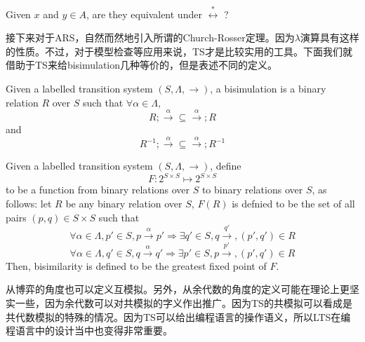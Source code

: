 \begin{definition}
	Given $x$ and $y\in A$, are they equivalent under $\overset{*}{\leftrightarrow}$ ?
\end{definition}

接下来对于ARS，自然而然地引入所谓的Church-Rosser定理。因为$\lambda$演算具有这样的性质。不过，对于模型检查等应用来说，TS才是比较实用的工具。下面我们就借助于TS来给bisimulation几种等价的，但是表述不同的定义。

\begin{definition}
Given a labelled transition system $(S, \Lambda, \rightarrow)$, a bisimulation is a binary relation $R$ over $S$ such that $\forall \alpha \in \Lambda$, 
\begin{equation}
	R;\overset{\alpha}{\rightarrow} \subseteq \overset{\alpha}{\rightarrow};R
\end{equation}
and 
\begin{equation}
	R^{-1};\overset{\alpha}{\rightarrow} \subseteq \overset{\alpha}{\rightarrow};R^{-1}
\end{equation}
\end{definition}

\begin{definition}
	Given a labelled transition system $(S, \Lambda, \rightarrow)$, define 
	\begin{equation}
		F: 2^{S\times S} \mapsto 2^{S\times S}
	\end{equation}
	to be a function from binary relations over $S$ to binary relations over $S$, as follows: let $R$ be any binary relation over $S$, $F(R)$ is defnied to be the set of all pairs $(p,q)\in S\times S$ such that
	\begin{equation}
		\forall \alpha\in\Lambda, p'\in S, p\overset{\alpha}{\rightarrow} p' \Rightarrow
		\exists q' \in S, q\overset{q'}{\rightarrow}, (p',q')\in R
	\end{equation}
	\begin{equation}
		\forall \alpha\in\Lambda, q'\in S, q\overset{\alpha}{\rightarrow} q' \Rightarrow
		\exists p' \in S, p\overset{p'}{\rightarrow}, (p',q')\in R
	\end{equation}
	Then, bisimilarity is defined to be the greatest fixed point of $F$.
\end{definition}

从博弈的角度也可以定义互模拟。另外，从余代数的角度的定义可能在理论上更坚实一些，因为余代数可以对共模拟的字义作出推广。因为TS的共模拟可以看成是共代数模拟的特殊的情况。因为TS可以给出编程语言的操作语义，所以LTS在编程语言中的设计当中也变得非常重要。  
